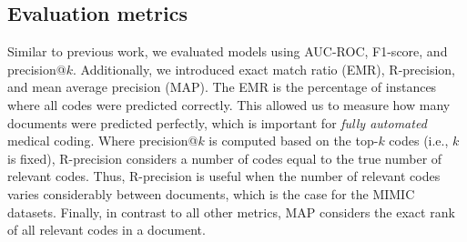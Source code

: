 {\subsection{Evaluation metrics}
\label{sec:metrics}
Similar to previous work, we evaluated models using AUC-ROC, F1-score, and precision@$k$. Additionally, we introduced exact match ratio (EMR), R-precision, and mean average precision (MAP). The EMR is the percentage of instances where all codes were predicted correctly. This allowed us to measure how many documents were predicted perfectly, which is important for \textit{fully automated} medical coding.
Where precision@$k$ is computed based on the top-$k$ codes (i.e., $k$ is fixed), R-precision considers a number of codes equal to the true number of relevant codes. Thus, R-precision is useful when the number of relevant codes varies considerably between documents, which is the case for the MIMIC datasets. Finally, in contrast to all other metrics, MAP considers the exact rank of all relevant codes in a document.


}
